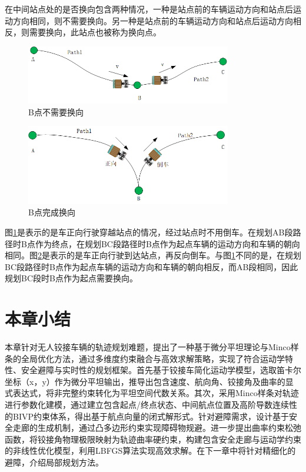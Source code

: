 \documentclass[master,academic]{ysuthesis} %
\begin{document}
		在中间站点处的是否换向包含两种情况，一种是站点前的车辆运动方向和站点后运动方向相同，则不需要换向。另一种是站点前的车辆运动方向和站点后运动方向相反，则需要换向，此站点也被称为换向点。
		\begin{figure}[!ht]
			\centering
			\includegraphics[width=0.8\textwidth]{换向1.png}
			\caption{B点不需要换向}
			\label{fig:换向1}
		\end{figure}
		\begin{figure}[!ht]
			\centering
			\includegraphics[width=0.8\textwidth]{换向2.png}
			\caption{B点完成换向}
			\label{fig:换向2}
		\end{figure}
		图\ref{fig:换向1}是表示的是车正向行驶穿越站点的情况，经过站点时不用倒车。在规划AB段路径时B点作为终点，在规划BC段路径时B点作为起点车辆的运动方向和车辆的朝向相同。图\ref{fig:换向2}是表示的是车正向行驶到达站点，再反向倒车。与图\ref{fig:换向1}不同的是，在规划BC段路径时B点作为起点车辆的运动方向和车辆的朝向相反，而AB段相同，因此规划BC段时B点作为起点需要换向。

	\section{本章小结}
	本章针对无人铰接车辆的轨迹规划难题，提出了一种基于微分平坦理论与Minco样条的全局优化方法，通过多维度约束融合与高效求解策略，实现了符合运动学特性、安全避障与实时性的规划框架。首先基于铰接车简化运动学模型，选取笛卡尔坐标（x，y）作为微分平坦输出，推导出包含速度、航向角、铰接角及曲率的显式表达式，将非完整约束转化为平坦空间代数关系。其次，采用Minco样条对轨迹进行参数化建模，通过建立包含起点/终点状态、中间航点位置及高阶导数连续性的BIVP约束体系，得出基于航点向量的闭式解形式。针对避障需求，设计基于安全走廊的生成机制，通过凸多边形约束实现障碍物规避。进一步提出曲率约束松弛函数，将铰接角物理极限映射为轨迹曲率硬约束，构建包含安全走廊与运动学约束的非线性优化模型，利用LBFGS算法实现高效求解。在下一章中将针对精细化的避障，介绍局部规划方法。
	
\end{document}
